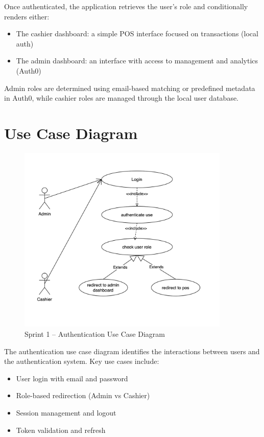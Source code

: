 Once authenticated, the application retrieves the user's role and conditionally renders either:

\begin{itemize}
  \item The cashier dashboard: a simple POS interface focused on transactions (local auth)
  \item The admin dashboard: an interface with access to management and analytics (Auth0)
\end{itemize}

Admin roles are determined using email-based matching or predefined metadata in Auth0, while cashier roles are managed through the local user database.

\section{Use Case Diagram}

\begin{figure}[H]
  \centering
  \includegraphics[width=0.9\textwidth]{figures/images/sprint1usecase.png}
  \caption{Sprint 1 – Authentication Use Case Diagram}
  \label{fig:sprint1-usecase}
\end{figure}

The authentication use case diagram identifies the interactions between users and the authentication system. Key use cases include:

\begin{itemize}
  \item User login with email and password
  \item Role-based redirection (Admin vs Cashier)
  \item Session management and logout
  \item Token validation and refresh
\end{itemize}

